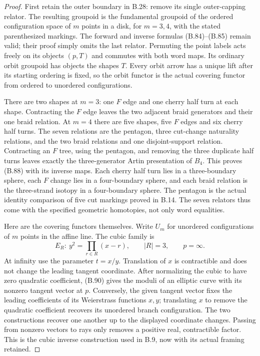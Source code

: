 \begin{proof}
First retain the outer boundary in B.28: remove its single
outer-capping relator.  The resulting groupoid is the fundamental
groupoid of the ordered configuration space of $m$ points in a
disk, for $m=3,4$, with the stated parenthesized markings.  The
forward and inverse formulas (B.84)--(B.85) remain valid; their
proof simply omits the last relator.  Permuting the point labels
acts freely on its objects $(p,T)$ and commutes with both word
maps.  Its ordinary orbit groupoid has objects the shapes $T$.
Every orbit arrow has a unique lift after its starting ordering
is fixed, so the orbit functor is the actual covering functor
from ordered to unordered configurations.

There are two shapes at $m=3$: one $F$ edge and one cherry
half turn at each shape.  Contracting the $F$ edge leaves the
two adjacent braid generators and their one braid relation.
At $m=4$ there are five shapes, five $F$ edges and six cherry
half turns.  The seven relations are the pentagon, three
cut-change naturality relations, and the two braid relations
and one disjoint-support relation.  Contracting an $F$ tree,
using the pentagon, and removing the three duplicate half
turns leaves exactly the three-generator Artin presentation
of $B_4$.  This proves (B.88) with its inverse maps.  Each
cherry half turn lies in a three-boundary sphere, each $F$
change lies in a four-boundary sphere, and each braid relation
is the three-strand isotopy in a four-boundary sphere.
The pentagon is the actual identity comparison of five cut
markings proved in B.14.  The seven relators thus come with
the specified geometric homotopies, not only word equalities.

Here are the covering functors themselves.  Write $U_m$ for
unordered configurations of $m$ points in the affine line.
The cubic family is
\[
 E_R:\ y^2=\prod_{r\in R}(x-r),\qquad |R|=3,
 \qquad p=\infty .                                             \tag{B.90}
\]
At infinity use the parameter $t=x/y$.  Translation of $x$
is contractible and does not change the leading tangent
coordinate.  After normalizing the cubic to have zero
quadratic coefficient, (B.90) gives the moduli of an elliptic
curve with its nonzero tangent vector at $p$.  Conversely,
the given tangent vector fixes the leading coefficients of
its Weierstrass functions $x,y$; translating $x$ to remove
the quadratic coefficient recovers its unordered branch
configuration.  The two constructions recover one another
up to the displayed coordinate changes.  Passing from
nonzero vectors to rays only removes a positive real,
contractible factor.  This is the cubic inverse construction
used in B.9, now with its actual framing retained.


\end{proof}
